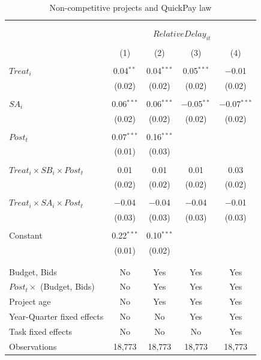 \documentclass[]{article}
\begin{document}
\begin{table}[H] \centering 
  \caption{Non-competitive projects and QuickPay law} 
  \label{} 
\small 
\begin{tabular}{@{\extracolsep{-2pt}}lcccc} 
\\[-1.8ex]\hline 
\hline \\[-1.8ex] 
\\[-1.8ex] & \multicolumn{4}{c}{$RelativeDelay_{it}$} \\ 
\\[-1.8ex] & (1) & (2) & (3) & (4)\\ 
\hline \\[-1.8ex] 
 $Treat_i$ & 0.04$^{**}$ & 0.04$^{***}$ & 0.05$^{***}$ & $-$0.01 \\ 
  & (0.02) & (0.02) & (0.02) & (0.02) \\ 
  & & & & \\ 
 $SA_i$ & 0.06$^{***}$ & 0.06$^{***}$ & $-$0.05$^{**}$ & $-$0.07$^{***}$ \\ 
  & (0.02) & (0.02) & (0.02) & (0.02) \\ 
  & & & & \\ 
 $Post_t$ & 0.07$^{***}$ & 0.16$^{***}$ &  &  \\ 
  & (0.01) & (0.03) &  &  \\ 
  & & & & \\ 
 $Treat_i \times SB_i \times Post_t$ & 0.01 & 0.01 & 0.01 & 0.03 \\ 
  & (0.02) & (0.02) & (0.02) & (0.02) \\ 
  & & & & \\ 
 $Treat_i \times SA_i \times Post_t$ & $-$0.04 & $-$0.04 & $-$0.04 & $-$0.01 \\ 
  & (0.03) & (0.03) & (0.03) & (0.03) \\ 
  & & & & \\ 
 Constant & 0.22$^{***}$ & 0.10$^{***}$ &  &  \\ 
  & (0.01) & (0.02) &  &  \\ 
  & & & & \\ 
\hline \\[-1.8ex] 
Budget, Bids & No & Yes & Yes & Yes \\ 
$Post_t \times $  (Budget, Bids) & No & Yes & Yes & Yes \\ 
Project age & No & Yes & Yes & Yes \\ 
Year-Quarter fixed effects & No & No & Yes & Yes \\ 
Task fixed effects & No & No & No & Yes \\ 
Observations & 18,773 & 18,773 & 18,773 & 18,773 \\ 

\end{tabular}
\end{table}
\end{document}
